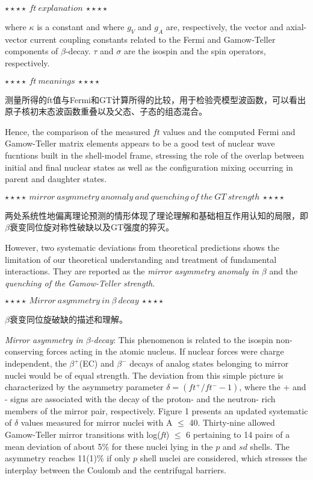 \documentclass[UTF8]{ctexart}
\begin{document}
$\star\star\star\star~ft~explanation~\star\star\star\star$

where $\kappa$ is a constant and where $g_{V}$ and $g_{A}$ are, respectively, the vector and axial-vector current coupling constants related to the Fermi and Gamow-Teller components of $\beta$-decay. $\tau$ and $\sigma$ are the isospin and the spin operators, respectively. 

$\star\star\star\star~ft~meanings~\star\star\star\star$

测量所得的ft值与Fermi和GT计算所得的比较，用于检验壳模型波函数，可以看出原子核初末态波函数重叠以及父态、子态的组态混合。

Hence, the comparison of the measured $ft$ values and the computed Fermi and Gamow-Teller matrix elements appears to be a good test of nuclear wave fucntions built in the shell-model frame, stressing the role of the overlap between initial and final nuclear states as well as the configuration mixing occurring in parent and daughter states. 

$\star\star\star\star~mirror~asymmetry~anomaly~and~quenching~of~the~GT~strength~\star\star\star\star$

两处系统性地偏离理论预测的情形体现了理论理解和基础相互作用认知的局限，即 $\beta$衰变同位旋对称性破缺以及GT强度的猝灭。

However, two systematic deviations from theoretical predictions shows the limitation of our theoretical understanding and treatment of fundamental interactions. They are reported as the \textit{mirror asymmetry anomaly in $\beta$} and the \textit{quenching of the Gamow-Teller strength}.

$\star\star\star\star~Mirror~asymmetry~in~\beta~decay~\star\star\star\star$

$\beta$衰变同位旋破缺的描述和理解。

\textit{Mirror asymmetry in $\beta$-decay}: This phenomenon is related to the isospin non-conserving forces acting in the atomic nucleus. If nuclear forces were charge independent, the $\beta^{+}$(EC) and $\beta^{-}$ decays of analog states belonging to mirror nuclei would be of equal strength. The deviation from this simple picture is characterized by the asymmetry parameter $\delta=\left( ft^{+}/ft^{-}-1 \right)$, where the + and - signs are associated with the decay of the proton- and the neutron- rich members of the mirror pair, respectively. Figure 1 presents an updated systematic of $\delta$ values measured for mirror nuclei with A $\leq$ 40. Thirty-nine allowed Gamow-Teller mirror transitions with log(\textit{ft}) $\leq$ 6 pertaining to 14 pairs of a mean deviation of about 5\% for these nuclei lying in the $p$ and $sd$ shells. The asymmetry reaches 11(1)\% if only $p$ shell nuclei are considered, which stresses the interplay between the Coulomb and the centrifugal barriers.
\end{document}
